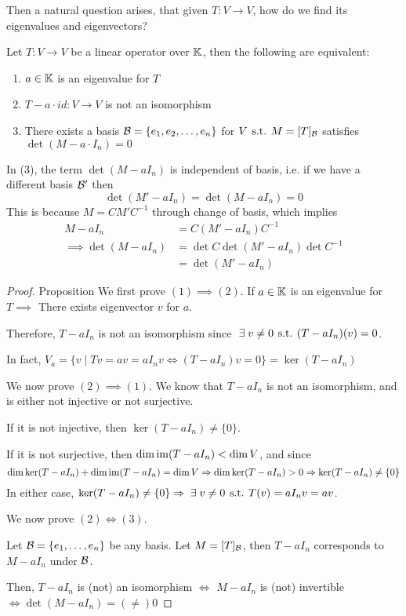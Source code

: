 Then a natural question arises, that given \(T: V \to V\), how do we find its eigenvalues and eigenvectors?

\begin{proposition}
    Let \(T: V \to V\) be a linear operator over \(\mathbb{K}\), then the following are equivalent:
    \begin{enumerate}
        \item \(a \in \mathbb{K}\) is an eigenvalue for \(T\)
        \item \(T - a \cdot id: V \to V\) is not an isomorphism
        \item There exists a basis \(\mathcal{B} = \{e_1, e_2, \ldots, e_n\}\) for \(V \hspace*{4pt}\text{s.t.}\hspace*{4pt} M= [T]_{\mathcal{B}} \) satisfies \(\det (M - a\cdot I_n) = 0\)
    \end{enumerate}
\end{proposition}

\begin{remark}
    In (3), the term \(\det (M - a I_n)\) is independent of basis, i.e. if we have a different basis \(\mathcal{B} '\) then \[
        \det(M' - a I_n) = \det(M - a I_n) =  0
    \]
    This is because \(M = C M' C^{-1}\) through change of basis, which implies
    \begin{align*}
        M - a I_n              & = C (M' - a I_n) C^{-1}               \\
        \implies \det(M-a I_n) & = \det C \det (M' - aI_n) \det C^{-1} \\
                               & = \det (M' - a I_n)
    \end{align*}
\end{remark}

\begin{proof} {Proposition}
    We first prove \((1) \implies (2)\). If \(a \in \mathbb{K}\) is an eigenvalue for \(T \implies \) There exists eigenvector \(v\) for \(a\).

    Therefore, \(T - a I_n\) is not an isomorphism since \(\exists v \neq 0 \st (T - a I_n) (v) = 0\).

    In fact, \(V_a  = \{v \mid Tv = av = aI_n v \Leftrightarrow (T - a I_n) v = 0 \} = \ker(T  - a I_n)\)

    We now prove \((2) \implies (1)\). We know that \(T - aI_n\) is not an isomorphism, and is either not injective or not surjective.

    If it is not injective, then \(\ker(T - aI_n) \neq \{0\}\).

    If it is not surjective, then \(\dim \mathrm{im} (T - aI_n) < \dim V\), and since \[
        \dim \ker (T - aI_n) + \dim \mathrm{im} (T - aI_n)= \dim V \Rightarrow \dim \ker (T - aI_n) > 0 \Rightarrow \ker (T - aI_n) \neq \{0\}
    \]
    In either case, \(\ker (T - aI_n) \neq \{0\} \implies \exists v \neq 0 \st T(v) = a I_n v = av\).

    We now prove \((2) \Leftrightarrow (3)\).

    Let \(\mathcal{B} = \{e_1, \dots, e_n\}\) be any basis. Let \(M = [T]_{\mathcal{B}}\), then \(T - aI_n\) corresponds to \(M - aI_n\) under \(\mathcal{B}\).

    Then, \(T - aI_n\) is (not) an isomorphism \(\Leftrightarrow\) \(M - aI_n\) is (not) invertible \(\Leftrightarrow \det (M - aI_n) = (\neq) 0\)
\end{proof}

